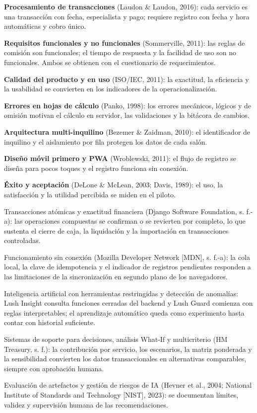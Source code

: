 \begin{vinetas}
\item \textbf{Procesamiento de transacciones} (Laudon \& Laudon, 2016): cada servicio es una transacción con fecha, especialista y pago; requiere registro con fecha y hora automáticas y cobro único.
\item \textbf{Requisitos funcionales y no funcionales} (Sommerville, 2011): las reglas de comisión son funcionales; el tiempo de respuesta y la facilidad de uso son no funcionales. Ambos se obtienen con el cuestionario de requerimientos.
\item \textbf{Calidad del producto y en uso} (ISO/IEC, 2011): la exactitud, la eficiencia y la usabilidad se convierten en los indicadores de la operacionalización.
\item \textbf{Errores en hojas de cálculo} (Panko, 1998): los errores mecánicos, lógicos y de omisión motivan el cálculo en servidor, las validaciones y la bitácora de cambios.
\item \textbf{Arquitectura multi-inquilino} (Bezemer \& Zaidman, 2010): el identificador de inquilino y el aislamiento por fila protegen los datos de cada salón.
\item \textbf{Diseño móvil primero y PWA} (Wroblewski, 2011): el flujo de registro se diseña para pocos toques y el registro funciona sin conexión.
\item \textbf{Éxito y aceptación} (DeLone \& McLean, 2003; Davis, 1989): el uso, la satisfacción y la utilidad percibida se miden en el piloto.
\item Transacciones atómicas y exactitud financiera (Django Software Foundation, s. f.-a): las operaciones compuestas se confirman o se revierten por completo, lo que sustenta el cierre de caja, la liquidación y la importación en transacciones controladas.
\item Funcionamiento sin conexión (Mozilla Developer Network [MDN], s. f.-a): la cola local, la clave de idempotencia y el indicador de registros pendientes responden a las limitaciones de la sincronización en segundo plano de los navegadores.
\item Inteligencia artificial con herramientas restringidas y detección de anomalías: Lush Insight consulta funciones cerradas del backend y Lush Guard comienza con reglas interpretables; el aprendizaje automático queda como experimento hasta contar con historial suficiente.
\item Sistemas de soporte para decisiones, análisis What-If y multicriterio (HM Treasury, s. f.): la contribución por servicio, los escenarios, la matriz ponderada y la sensibilidad convierten los datos transaccionales en alternativas comparables, siempre con aprobación humana.
\item Evaluación de artefactos y gestión de riesgos de IA (Hevner et al., 2004; National Institute of Standards and Technology [NIST], 2023): se documentan límites, validez y supervisión humana de las recomendaciones.
\end{vinetas}
